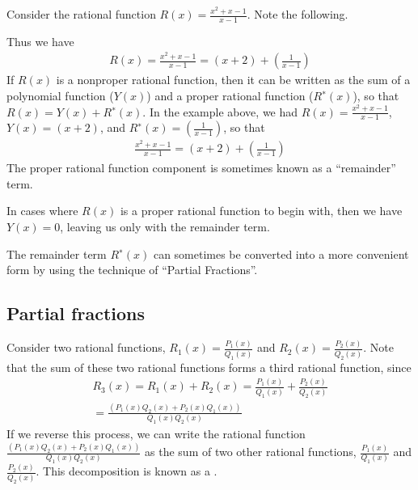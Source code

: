 \documentclass[letterpaper,10pt,english]{jupyterBook}
\begin{document}
\sphinxAtStartPar
Consider the rational function \(R(x) = \frac{x^2 + x − 1}{x − 1}\). Note the following.

\sphinxAtStartPar
Thus we have
\begin{equation*}
\begin{split}
R(x) = \frac{x^2 + x − 1}{x − 1} = (x + 2) + \left( \frac{1}{x − 1} \right)
\end{split}
\end{equation*}
\sphinxAtStartPar
If \(R(x)\) is a non\sphinxhyphen{}proper rational function, then it can be written as the sum of a polynomial function (\(Y(x)\)) and a proper rational function (\(R^∗(x)\)), so that \(R(x) = Y(x) + R^∗(x)\).  In the example above, we had \(R(x) = \frac{x^2 + x − 1}{x − 1}\), \(Y(x) = (x + 2)\), and \(R^∗(x) = \left( \frac{1}{x − 1} \right)\), so that
\begin{equation*}
\begin{split}
\frac{x^2 + x − 1}{x − 1} = (x + 2) + \left( \frac{1}{x − 1} \right)
\end{split}
\end{equation*}
\sphinxAtStartPar
The proper rational function component is sometimes known as a “remainder” term.

\sphinxAtStartPar
In cases where \(R(x)\) is a proper rational function to begin with, then we have \(Y(x) = 0\), leaving us only with the remainder term.

\sphinxAtStartPar
The remainder term \(R^∗(x)\) can sometimes be converted into a more convenient form by using the technique of “Partial Fractions”.


\subsection{Partial fractions}
\label{\detokenize{03.mappings_functions_correspondences:partial-fractions}}
\sphinxAtStartPar
Consider two rational functions, \(R_1(x) = \frac{P_1(x)}{Q_1(x)}\) and \(R_2(x) = \frac{P_2(x)}{Q_2(x)}\).  Note that the sum of these two rational functions forms a third rational function, since
\begin{equation*}
\begin{split}
R_3(x) = R_1(x) + R_2(x) 
= \frac{P_1(x)}{Q_1(x)} + \frac{P_2(x)}{Q_2(x)} \\
= \frac{(P_1(x) Q_2(x) + P_2(x) Q_1(x))}{Q_1(x) Q_2(x)}
\end{split}
\end{equation*}
\sphinxAtStartPar
If we reverse this process, we can write the rational function \(\frac{(P_1(x) Q_2(x) + P_2(x) Q_1(x))}{Q_1(x) Q_2(x)}\) as the sum of two other rational functions, \(\frac{P_1(x)}{Q_1(x)}\) and \(\frac{P_2(x)}{Q_2(x)}\). This decomposition is known as a .
\end{document}
